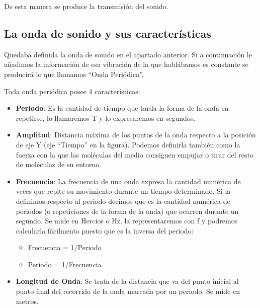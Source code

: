 De esta manera se produce la transmisión del sonido.

\subsection{La onda de sonido y sus características}\label{sec:Ondas} 

Quedaba definida la onda de sonido en el apartado anterior. Si a continuación le añadimos la información de esa vibración de la que hablábamos es constante se producirá lo que llamamos ``Onda Periódica''.

Toda onda periódica posee 4 características:

\begin{itemize}
	\item \textbf{Periodo}: Es la cantidad de tiempo que tarda la forma de la onda en repetirse, lo llamaremos T y lo expresaremos en segundos.
	 \item \textbf{Amplitud}: Distancia máxima de los puntos de la onda respecto a la posición de eje Y (eje ``Tiempo'' en la figura). Podemos definirla también como la fuerza con la que las moléculas del medio consiguen empujar o tirar del resto de moléculas de su entorno.
    \item \textbf{Frecuencia}: La frecuencia de una onda expresa la cantidad numérica de veces que repite su movimiento durante un tiempo determinado. Si la definimos respecto al periodo decimos que es la cantidad numérica de periodos (o repeticiones de la forma de la onda) que ocurren durante un segundo. Se mide en Hercios o Hz, la representaremos con f y podremos calcularla fácilmento puesto que es la inversa del periodo:
    \begin{itemize}
    \item Frecuencia = 1/Periodo
    \item Periodo = 1/Frecuencia   
    \end{itemize}
    \item \textbf{Longitud de Onda}: Se trata de la distancia que va del punto inicial al punto final del recorrido de la onda marcada por un periodo. Se mide en metros.
\end{itemize} 


